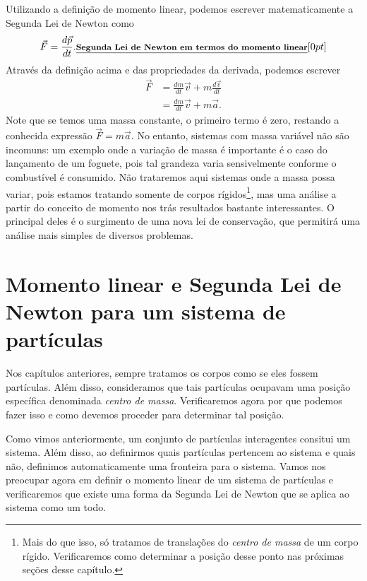 Utilizando a definição de momento linear, podemos escrever matematicamente a Segunda Lei de Newton como
\begin{equation}\label{Eq:SegundaLeiMomento}
    \vec{F} = \frac{d\vec{p}}{dt}. \relax{\footnotesize\emph{\textbf{Segunda Lei de Newton em termos do momento linear}}}[0pt]
\end{equation}
%
Através da definição acima e das propriedades da derivada, podemos escrever
\begin{align}
    \vec{F} &= \frac{dm}{dt}\vec{v} + m\frac{d\vec{v}}{dt} \\
    &= \frac{dm}{dt}\vec{v} + m\vec{a}.
\end{align}
%
Note que se temos uma massa constante, o primeiro termo é zero, restando a conhecida expressão $\vec{F} = m\vec{a}$. No entanto, sistemas com massa variável não são incomuns: um exemplo onde a variação de massa é importante é o caso do lançamento de um foguete, pois tal grandeza varia sensivelmente conforme o combustível é consumido. Não trataremos aqui sistemas onde a massa possa variar, pois estamos tratando somente de corpos rígidos\footnote{Mais do que isso, só tratamos de translações do \emph{centro de massa} de um corpo rígido. Verificaremos como determinar a posição desse ponto nas próximas seções desse capítulo.}, mas uma análise a partir do conceito de momento nos trás resultados bastante interessantes. O principal deles é o surgimento de uma nova lei de conservação, que permitirá uma análise mais simples de diversos problemas.

\section{Momento linear e Segunda Lei de Newton para um sistema de partículas}

Nos capítulos anteriores, sempre tratamos os corpos como se eles fossem partículas. Além disso, consideramos que tais partículas ocupavam uma posição específica denominada \emph{centro de massa}. Verificaremos agora por que podemos fazer isso e como devemos proceder para determinar tal posição.

Como vimos anteriormente, um conjunto de partículas interagentes consitui um sistema. Além disso, ao definirmos quais partículas pertencem ao sistema e quais não, definimos automaticamente uma fronteira para o sistema. Vamos nos preocupar agora em definir o momento linear de um sistema de partículas e verificaremos que existe uma forma da Segunda Lei de Newton que se aplica ao sistema como um todo.

